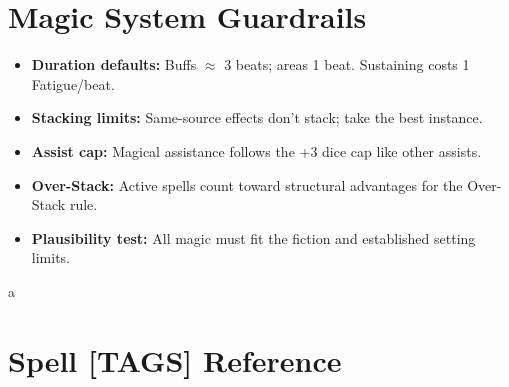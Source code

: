 \section{Magic System Guardrails}
\label{sec:magic-guardrails}

\begin{itemize}
\item \textbf{Duration defaults:} Buffs $\approx$ 3 beats; areas 1 beat. Sustaining costs 1 Fatigue/beat. 
\item \textbf{Stacking limits:} Same-source effects don't stack; take the best instance. 
\item \textbf{Assist cap:} Magical assistance follows the +3 dice cap like other assists. 
\item \textbf{Over-Stack:} Active spells count toward structural advantages for the Over-Stack rule. 
\item \textbf{Plausibility test:} All magic must fit the fiction and established setting limits. 
\end{itemize}a


\section*{Spell [TAGS] Reference}
\label{sec:spell-tags}

